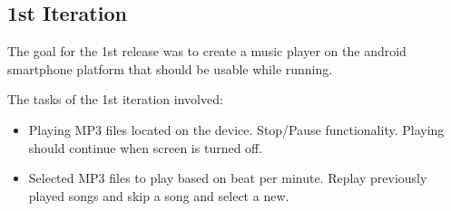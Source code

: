 \subsection{1st Iteration}
The goal for the 1st release was to create a music player on the android smartphone platform that should be usable while running. 


The tasks of the 1st iteration involved:
\begin{itemize}
\item Playing MP3 files located on the device.
\subitem Stop/Pause functionality.
\subitem Playing should continue when screen is turned off.
\item Selected MP3 files to play based on beat per minute. 
\subitem Replay previously played songs and skip a song and select a new.
\end{itemize}

